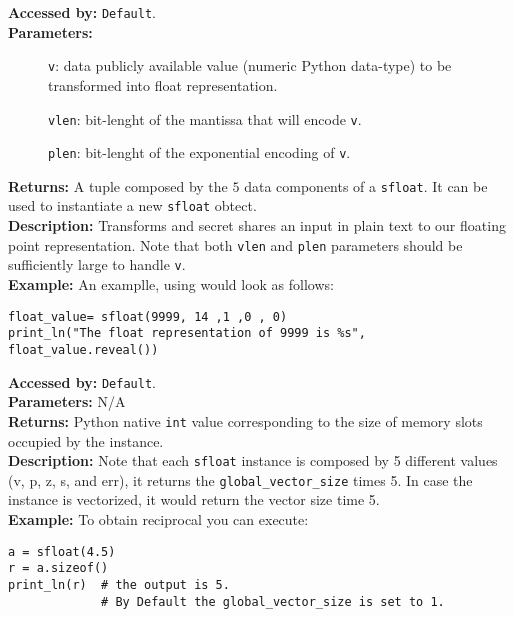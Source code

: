 		      \textbf{Accessed by:} \verb|Default|. \\
		      \textbf{Parameters:}
		      \begin{description}
			     \item[]\verb|v|: data publicly available value (numeric Python data-type) to be transformed into float representation.
			     \item[]\verb|vlen|: bit-lenght of the mantissa that will encode \verb|v|.
			     \item[]\verb|plen|: bit-lenght of the exponential encoding of \verb|v|.
		      \end{description}
		      \textbf{Returns:} A tuple composed by the $5$ data components of a \verb|sfloat|. 
		      It can be used to instantiate a new \verb|sfloat| obtect.\\
		      \textbf{Description:} Transforms and secret shares an input 
		      in plain text to our floating point representation. 
		      Note that both \verb|vlen| and \verb|plen| parameters should 
		      be sufficiently large to handle \verb|v|.\\
		\textbf{Example:}
		An examplle, using  would look as follows:
\begin{lstlisting}
float_value= sfloat(9999, 14 ,1 ,0 , 0) 
print_ln("The float representation of 9999 is %s", float_value.reveal())		
\end{lstlisting}
                        \textbf{Accessed by:} \verb|Default|. \\
                        \textbf{Parameters:} N/A \\
                        \textbf{Returns:}
                                 Python native \verb|int| value corresponding to the size of 
                                 memory slots occupied by the instance. \\
                        \textbf{Description:}
                                Note that each \verb|sfloat| instance is composed by 5 
                                different values (v, p, z, s, and err), 
                                it returns the \verb|global_vector_size| times 5. 
                                In case the instance is vectorized, 
                                it would return the vector size time 5.\\
                \textbf{Example:}
                    To obtain reciprocal you can execute:
\begin{lstlisting}
a = sfloat(4.5)
r = a.sizeof()
print_ln(r)  # the output is 5. 
			 # By Default the global_vector_size is set to 1.
\end{lstlisting}
                        
